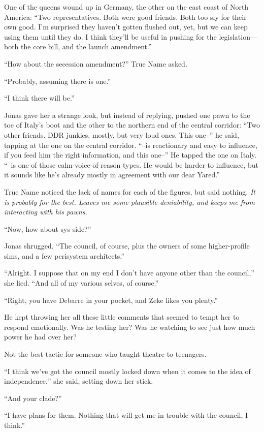 One of the queens wound up in Germany, the other on the east coast of North America: ``Two representatives. Both were good friends. Both too sly for their own good. I'm surprised they haven't gotten flushed out, yet, but we can keep using them until they do. I think they'll be useful in pushing for the legislation---both the core bill, and the launch amendment.''

``How about the secession amendment?'' True Name asked.

``Probably, assuming there is one.''

``I think there will be.''

Jonas gave her a strange look, but instead of replying, pushed one pawn to the toe of Italy's boot and the other to the northern end of the central corridor: ``Two other friends. DDR junkies, mostly, but very loud ones. This one--'' he said, tapping at the one on the central corridor. ``--is reactionary and easy to influence, if you feed him the right information, and this one--'' He tapped the one on Italy. ``--is one of those calm-voice-of-reason types. He would be harder to influence, but it sounds like he's already mostly in agreement with our dear Yared.''

True Name noticed the lack of names for each of the figures, but said nothing. \emph{It is probably for the best. Leaves me some plausible deniability, and keeps me from interacting with his pawns.}

``Now, how about sys-side?''

Jonas shrugged. ``The council, of course, plus the owners of some higher-profile sims, and a few perisystem architects.''

``Alright. I suppose that on my end I don't have anyone other than the council,'' she lied. ``And all of my various selves, of course.''

``Right, you have Debarre in your pocket, and Zeke likes you plenty.''

He kept throwing her all these little comments that seemed to tempt her to respond emotionally. Was he testing her? Was he watching to see just how much power he had over her?

Not the best tactic for someone who taught theatre to teenagers.

``I think we've got the council mostly locked down when it comes to the idea of independence,'' she said, setting down her stick.

``And your clade?''

``I have plans for them. Nothing that will get me in trouble with the council, I think.''


